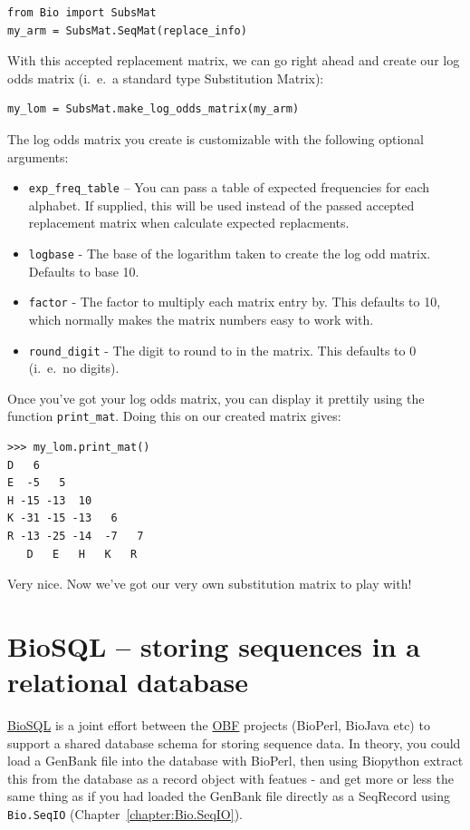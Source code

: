 \documentclass{report}
\begin{document}
\begin{verbatim}
from Bio import SubsMat
my_arm = SubsMat.SeqMat(replace_info)
\end{verbatim}

With this accepted replacement matrix, we can go right ahead and
create our log odds matrix (i.~e.~a standard type Substitution Matrix):

\begin{verbatim}
my_lom = SubsMat.make_log_odds_matrix(my_arm)
\end{verbatim}

The log odds matrix you create is customizable with the following
optional arguments:

\begin{itemize}
  \item \verb|exp_freq_table| -- You can pass a table of expected
  frequencies for each alphabet. If supplied, this will be used
  instead of the passed accepted replacement matrix when calculate
  expected replacments.

  \item \verb|logbase| - The base of the logarithm taken to create the
  log odd matrix. Defaults to base 10.

  \item \verb|factor| - The factor to multiply each matrix entry
  by. This defaults to 10, which normally makes the matrix numbers
  easy to work with.

  \item \verb|round_digit| - The digit to round to in the matrix. This
  defaults to 0 (i.~e.~no digits).

\end{itemize}

Once you've got your log odds matrix, you can display it prettily
using the function \verb|print_mat|. Doing this on our created matrix
gives:

\begin{verbatim}
>>> my_lom.print_mat()
D   6
E  -5   5
H -15 -13  10
K -31 -15 -13   6
R -13 -25 -14  -7   7
   D   E   H   K   R
\end{verbatim}

Very nice. Now we've got our very own substitution matrix to play with!

\section{BioSQL -- storing sequences in a relational database}
\label{sec:BioSQL}
\href{http://www.biosql.org/}{BioSQL} is a joint effort between the
\href{http://open-bio.org/}{OBF} projects (BioPerl, BioJava etc) to support a
shared database schema for storing sequence data. In theory, you could load a
GenBank file into the database with BioPerl, then using Biopython extract this
from the database as a record object with featues - and get more or less the same
thing as if you had loaded the GenBank file directly as a SeqRecord using
\verb|Bio.SeqIO| (Chapter~\ref{chapter:Bio.SeqIO}).
\end{document}
